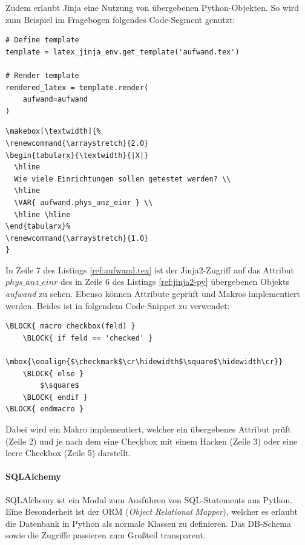 Zudem erlaubt Jinja eine Nutzung von übergebenen Python-Objekten. So wird zum Beispiel im Fragebogen folgendes Code-Segment genutzt:
\lstset{language=Python}
\begin{lstlisting}[caption=Aufrufender Python-Code,label=ref:jinja2-py]
# Define template
template = latex_jinja_env.get_template('aufwand.tex')

# Render template
rendered_latex = template.render(
    aufwand=aufwand
)
\end{lstlisting}
\lstset{language=Tex}
\begin{lstlisting}[caption=aufwand.tex,label=ref:aufwand.tex]
\makebox[\textwidth]{%
\renewcommand{\arraystretch}{2.0}
\begin{tabularx}{\textwidth}{|X|}
  \hline
  Wie viele Einrichtungen sollen getestet werden? \\
  \hline
  \VAR{ aufwand.phys_anz_einr }	\\
  \hline \hline
\end{tabularx}%
\renewcommand{\arraystretch}{1.0}
}
\end{lstlisting}
In Zeile 7 des Listings \ref{ref:aufwand.tex} ist der Jinja2-Zugriff auf das Attribut \textit{$phys\_anz\_einr$} des in Zeile 6 des Listings \ref{ref:jinja2-py} übergebenen Objekts \textit{aufwand} zu sehen. Ebenso können Attribute geprüft und Makros implementiert werden. Beides ist in folgendem Code-Snippet zu verwendet:
\begin{lstlisting}
\BLOCK{ macro checkbox(feld) }
    \BLOCK{ if feld == 'checked' }
        \mbox{\ooalign{$\checkmark$\cr\hidewidth$\square$\hidewidth\cr}}
    \BLOCK{ else }
        $\square$
    \BLOCK{ endif }
\BLOCK{ endmacro }
\end{lstlisting}
Dabei wird ein Makro implementiert, welcher ein übergebenes Attribut prüft (Zeile 2) und je nach dem eine Checkbox mit einem Hacken (Zeile 3) oder eine leere Checkbox (Zeile 5) darstellt.

\paragraph{SQLAlchemy}\label{ref:SQLAlchemy}
SQLAlchemy ist ein Modul zum Ausführen von SQL-Statements aus Python. Eine Besonderheit ist der ORM (\textit{Object Relational Mapper}), welcher es erlaubt die Datenbank in Python als normale Klassen zu definieren. Das DB-Schema sowie die Zugriffe passieren zum Großteil transparent.\\

